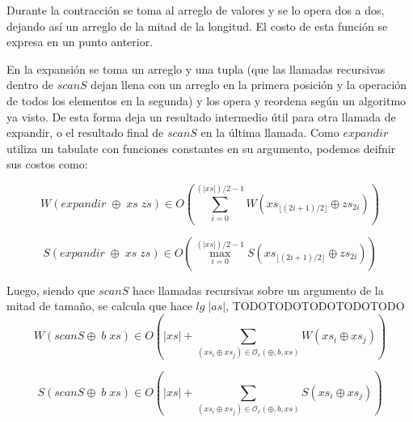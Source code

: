 \documentclass[a4paper,10pt]{article}
\begin{document}
\bigskip

    Durante la contracción se toma al arreglo de valores y se lo opera
dos a dos, dejando así un arreglo de la mitad de la longitud. El costo
de esta función se expresa en un punto anterior.

\bigskip

    En la expansión se toma un arreglo y una tupla (que las llamadas recursivas 
dentro de $scanS$ dejan llena con un arreglo en la primera posición y la 
operación de todos los elementos en la segunda) y los opera y reordena según un
algoritmo ya visto. De esta forma deja un resultado intermedio útil para otra
llamada de expandir, o el resultado final de $scanS$ en la última llamada. Como
$expandir$ utiliza un tabulate con funciones constantes en su argumento, podemos
deifnir sus costos como:

\begin{equation*}
    W \left( expandir \;\oplus \;xs \;zs \right) \in
    O \left( \sum_{i=0}^{(\vert xs \vert)/2 - 1} W \left( xs_{\lfloor (2i+1)/2 \rfloor} \oplus zs_{2i} \right) \right)
\end{equation*}

\begin{equation*}
    S \left( expandir \;\oplus \;xs \;zs \right) \in
    O \left( \max_{i=0}^{(\vert xs \vert)/2 - 1} S \left( xs_{\lfloor (2i+1)/2 \rfloor} \oplus zs_{2i} \right) \right)
\end{equation*}

\bigskip

    Luego, siendo que $scanS$ hace llamadas recursivas sobre un argumento de la
mitad de tamaño, se calcula que hace $lg \;\vert as \vert$, TODOTODOTODOTODOTODO
\begin{equation*}
    W \left( scanS \oplus \; b \; xs \right) \in
    O \left( \vert xs \vert + \sum_{(xs_i \oplus xs_j) \in \mathcal{O}_r(\oplus,b,xs)} W \left( xs_i \oplus xs_j \right) \right)
\end{equation*}

\begin{equation*}
    S \left( scanS \oplus \; b \; xs \right) \in
    O \left( \vert xs \vert + \sum_{(xs_i \oplus xs_j) \in \mathcal{O}_r(\oplus,b,xs)} S \left( xs_i \oplus xs_j \right) \right)
\end{equation*}




\end{document}

